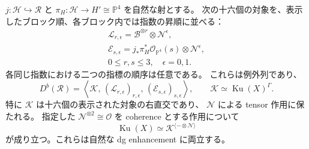 \begin{theorem}[十六個の明示例外対象による実残余模型]
\label{cmo:thm:eckardt-root-residual}
$j:\mathcal H\hookrightarrow\mathcal R$ と
$\pi_H:\mathcal H\to H'\cong\mathbb P^4$ を自然な射とする。
次の十六個の対象を、表示したブロック順、各ブロック内では指数の昇順に並べる：
\[
 \begin{gathered}
 \mathcal L_{r,\epsilon}=\mathcal B^{\otimes r}\otimes\mathcal N^\epsilon,
 \\
 \mathcal E_{s,\epsilon}=
 j_*\pi_H^*\mathcal O_{\mathbb P^4}(s)\otimes\mathcal N^\epsilon,
 \\ 0\le r,s\le3,\quad\epsilon=0,1.
 \end{gathered}
\]
各同じ指数における二つの指標の順序は任意である。
これらは例外列であり、
\begin{equation}
\label{cmo:eq:eckardt-sixteen-sod}
 D^b(\mathcal R)=
 \left\langle
 \mathcal K,\,
 (\mathcal L_{r,\epsilon})_{r,\epsilon},\,
 (\mathcal E_{s,\epsilon})_{s,\epsilon}
 \right\rangle,
 \qquad
 \mathcal K\simeq\operatorname{Ku}(X)^\Gamma.
\end{equation}
特に $\mathcal K$ は十六個の表示された対象の右直交であり、
$\mathcal N$ による tensor 作用に保たれる。
指定した $\mathcal N^{\otimes2}\cong\mathcal O$ を coherence とする作用について
\begin{equation}
\label{cmo:eq:eckardt-deequivariantization}
 \operatorname{Ku}(X)\simeq\mathcal K^{\langle-\otimes\mathcal N\rangle}
\end{equation}
が成り立つ。これらは自然な dg enhancement に両立する。
\end{theorem}

